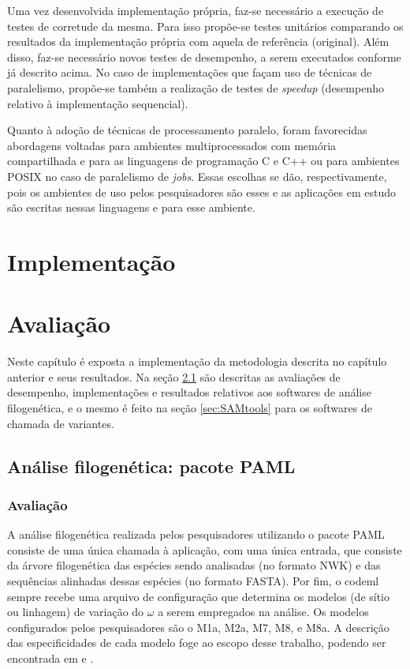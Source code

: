 \documentclass[cic,tc]{iiufrgs}
\begin{document}
{Uma vez desenvolvida implementação própria, faz-se necessário a execução de
testes de corretude da mesma. Para isso propõe-se testes unitários comparando
os resultados da implementação própria com aquela de referência (original).
Além disso, faz-se necessário novos testes de desempenho, a serem executados
conforme já descrito acima. No caso de implementações que façam uso de técnicas
de paralelismo, propõe-se também a realização de testes de \textit{speedup} (desempenho
relativo à implementação sequencial).

Quanto à adoção de técnicas de processamento paralelo, foram favorecidas
abordagens voltadas para ambientes multiprocessados com memória compartilhada e
para as linguagens de programação C e C++ ou para ambientes POSIX no caso de
paralelismo de \textit{jobs}. Essas escolhas se dão, respectivamente, pois os
ambientes de uso pelos pesquisadores são esses e as aplicações em estudo são
escritas nessas linguagens e para esse ambiente.

%
%
%
%
\chapter{Implementação}

%
%
%
%
\chapter{Avaliação}
\label{chap:imp}

Neste capítulo é exposta a implementação da metodologia descrita no capítulo
anterior e seus resultados. Na seção \ref{sec:filomp} são descritas as avaliações de
desempenho, implementações e resultados relativos aos softwares de análise
filogenética, e o mesmo é feito na seção \ref{sec:SAMtools} para os softwares de
chamada de variantes.

\section{Análise filogenética: pacote PAML}
\label{sec:filomp}

\subsection{Avaliação}

A análise filogenética realizada pelos pesquisadores utilizando o pacote PAML
consiste de uma única chamada à aplicação, com uma única entrada, que consiste
da árvore filogenética das espécies sendo analisadas (no formato NWK) e das
sequências alinhadas dessas espécies (no formato FASTA). Por fim, o codeml
sempre recebe uma arquivo de configuração que determina os modelos (de sítio ou
linhagem) de variação do $\omega$ a serem empregados na análise. Os modelos
configurados pelos pesquisadores são o M1a, M2a, M7, M8, e M8a. A descrição das
especificidades de cada modelo foge ao escopo desse trabalho, podendo ser
encontrada em \cite{yang2000codon} e \cite{zhang2005evaluation}.

}
\end{document}
